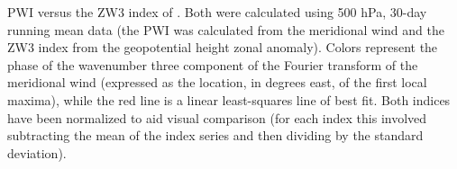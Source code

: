 \label{fig:metric_vs_zw3}
PWI versus the ZW3 index of \citet{Raphael2004}. Both were calculated using 500 hPa, 30-day running mean data (the PWI was calculated from the meridional wind and the ZW3 index from the geopotential height zonal anomaly). Colors represent the phase of the wavenumber three component of the Fourier transform of the meridional wind (expressed as the location, in degrees east, of the first local maxima), while the red line is a linear least-squares line of best fit. Both indices have been normalized to aid visual comparison (for each index this involved subtracting the mean of the index series and then dividing by the standard deviation).
    